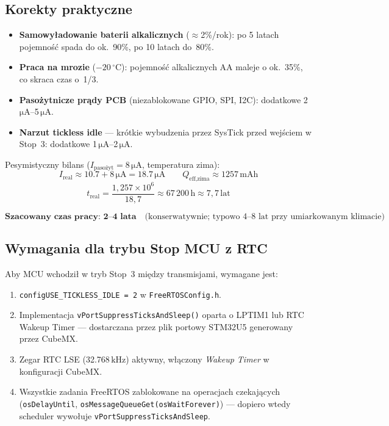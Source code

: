 \documentclass[12pt,a4paper]{article}
\newcommand{\qty}[2]{#1\,\ensuremath{#2}}
\newcommand{\kilo}{\mathrm{k}}
\newcommand{\milli}{\mathrm{m}}
\newcommand{\micro}{\mathrm{\mu}}
\newcommand{\hertz}{\mathrm{Hz}}
\newcommand{\ampere}{\mathrm{A}}
\newcommand{\hour}{\mathrm{h}}
\begin{document}
\subsection{Korekty praktyczne}

\begin{itemize}[noitemsep]
  \item \textbf{Samowyładowanie baterii alkalicznych} ($\approx$2\%/rok):
        po 5 latach pojemność spada do ok.~90\%, po 10 latach do~80\%.
  \item \textbf{Praca na mrozie} ($-20\,^\circ$C): pojemność alkalicznych AA
        maleje o ok.~35\%, co skraca czas o~1/3.
  \item \textbf{Pasożytnicze prądy PCB} (niezablokowane GPIO, SPI, I2C):
        dodatkowe \qty{2}{\micro\ampere}--\qty{5}{\micro\ampere}.
  \item \textbf{Narzut tickless idle} — krótkie wybudzenia przez SysTick
        przed wejściem w Stop~3: dodatkowe \qty{1}{\micro\ampere}--\qty{2}{\micro\ampere}.
\end{itemize}

Pesymistyczny bilans ($I_{\text{pasożyt}} = \qty{8}{\micro\ampere}$,
temperatura zima):
\[
  I_{\text{real}} \approx \qty{10.7 + 8}{\micro\ampere} = \qty{18.7}{\micro\ampere}
  \qquad
  Q_{\text{eff,zima}} \approx \qty{1257}{\milli\ampere\hour}
\]
\[
  t_{\text{real}}
  = \frac{1{,}257 \times 10^{6}}{18{,}7}
  \approx 67\,200\,\text{h}
  \approx 7{,}7\,\text{lat}
\]

\[
  \boxed{
    \textbf{Szacowany czas pracy: 2–4 lata}
    \quad\text{(konserwatywnie; typowo 4–8 lat przy umiarkowanym klimacie)}
  }
\]

\subsection{Wymagania dla trybu Stop MCU z RTC}
\label{sec:rtc}

Aby MCU wchodził w tryb Stop~3 między transmisjami, wymagane jest:

\begin{enumerate}[noitemsep]
  \item \texttt{configUSE\_TICKLESS\_IDLE~=~2} w \texttt{FreeRTOSConfig.h}.
  \item Implementacja \texttt{vPortSuppressTicksAndSleep()} oparta o LPTIM1
        lub RTC Wakeup Timer — dostarczana przez plik portowy STM32U5
        generowany przez CubeMX.
  \item Zegar RTC LSE (\qty{32.768}{\kilo\hertz}) aktywny,
        włączony \textit{Wakeup Timer} w konfiguracji CubeMX.
  \item Wszystkie zadania FreeRTOS zablokowane na operacjach czekających
        (\texttt{osDelayUntil}, \texttt{osMessageQueueGet(osWaitForever)}) —
        dopiero wtedy scheduler wywołuje \texttt{vPortSuppressTicksAndSleep}.
\end{enumerate}
\end{document}
